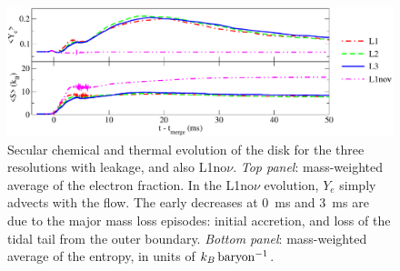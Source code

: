 \begin{figure} \centering
\includegraphics[width=18cm]{Figures/global_measures}
\caption[Secular chemical and thermal evolution of the disk]{
Secular chemical and thermal evolution of the disk for the three resolutions
with leakage, and also L1no$\nu$.
{\em Top panel}: mass-weighted average of the electron fraction.
In the L1no$\nu$ evolution, $Y_e$ simply advects with the flow.
The early decreases at 0~ms and 3~ms are due to the major mass loss episodes:
initial accretion, and loss of the tidal tail from the outer boundary.
{\em Bottom panel}: mass-weighted average of the entropy, in units of
$k_B\rm\,baryon^{-1}$.
}
\label{fig:globalevolution}
\end{figure}

